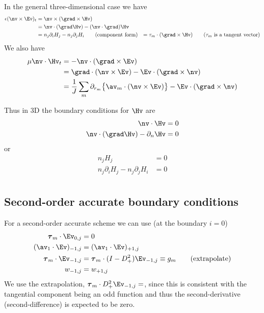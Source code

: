 \documentclass[10pt]{article}
\begin{document}
In the general three-dimensional case we have
\begin{align*}
  \eps (\nv\times\Ev)_t &= \nv\times(\grad\times\Hv) \\
                   &= \nv\cdot(\grad\Hv) - (\nv\cdot\grad)\Hv \\
                   &= n_j \partial_i H_j - n_j \partial_j H_i \qquad\mbox{(component form)}
                   &= \tau_m\cdot(\grad\times\Hv) \qquad\mbox{($\tau_m$ is a tangent vector)}
\end{align*}
We also have
\begin{align*}
 \mu \nv\cdot\Hv_t & = -\nv\cdot(\grad\times\Ev) \\
                   &= \grad\cdot(\nv\times\Ev) - \Ev\cdot(\grad\times\nv) \\
                   &= {1\over J}\sum_m \partial_{r_m}\big\{ \av_m\cdot(\nv\times\Ev)\big\}
                                                  - \Ev\cdot(\grad\times\nv) \\
\end{align*}

Thus in 3D the boundary conditions for $\Hv$ are
\begin{align*} 
  \nv\cdot\Hv &= 0 \\
  \nv\cdot(\grad\Hv) - \partial_n \Hv &= 0
\end{align*}
or 
\begin{align*} 
  n_j H_j  &= 0 \\
  n_j \partial_i H_j - n_j \partial_j H_i &= 0 \\
\end{align*}

\subsection{Second-order accurate boundary conditions}

For a second-order accurate scheme we can use (at the boundary $i=0$)
\begin{align*}
    \tauv_m\cdot\Ev_{0,j}  &=0  \\
     (\av_1\cdot\Ev)_{-1,j} &= (\av_1\cdot\Ev)_{+1,j} \\
    \tauv_m\cdot\Ev_{-1,j} &= \tauv_m \cdot (I-D_+^2)\Ev_{-1,j} \equiv g_m   \qquad\mbox{(extrapolate)}\\
     w_{-1,j} &= w_{+1,j}
\end{align*}
We use the extrapolation, $\tauv_m\cdot D_+^2\Ev_{-1,j}=$, since this is consistent with the
tangential component being an odd function and thus the second-derivative (second-difference)
is expected to be zero.
\end{document}
